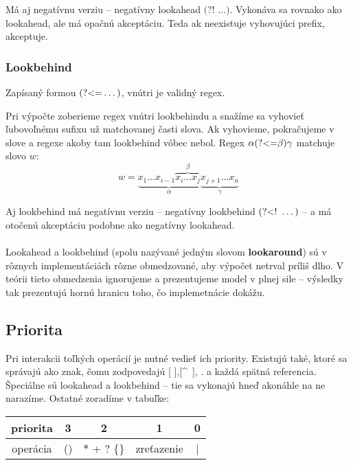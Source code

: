 \documentclass{svk_long_sk}
\def\nlookahead{\text{(?!~}}
\def\lookbehind{\text{(?\textless =}}
\def\nlookbehind{\text{(?\textless !~}}
\begin{document}
Má aj negatívnu verziu -- negatívny lookahead $\nlookahead \dots)$. Vykonáva sa rovnako ako lookahead, ale má opačnú akceptáciu. Teda ak neexistuje vyhovujúci prefix, akceptuje.

\subsubsection*{Lookbehind}
Zapísaný formou $\lookbehind \dots)$, vnútri je validný regex.

Pri výpočte zoberieme regex vnútri lookbehindu a snažíme sa vyhovieť ľubovoľnému sufixu už matchovanej časti slova. Ak vyhovieme, pokračujeme v slove a regexe akoby tam lookbehind vôbec nebol. Regex $\alpha\lookbehind\beta)\gamma$ matchuje slovo $w$:
$$w = \underbrace{x_1\dots x_{i-1} \overbrace{x_i \dots x_j}^\beta}_\alpha \underbrace{x_{j+1} \dots x_n }_\gamma$$

Aj lookbehind má negatívnu verziu -- negatívny lookbehind $\nlookbehind \dots)$ -- a má otočenú akceptáciu podobne ako negatívny lookahead.
\\ \\ Lookahead a lookbehind (spolu nazývané jedným slovom \textbf{lookaround}) sú v rôznych implementáciách rôzne obmedzované, aby výpočet netrval príliš dlho. V teórii tieto obmedzenia ignorujeme a prezentujeme model v plnej sile -- výsledky tak prezentujú hornú hranicu toho, čo implemetnácie dokážu. 

\subsection{Priorita}

Pri interakcii toľkých operácií je nutné vedieť ich priority. Existujú také, ktoré sa správajú ako znak, čomu zodpovedajú [ ],[\textasciicircum ~], . a každá spätná referencia. Špeciálne sú lookahead a lookbehind -- tie sa vykonajú hneď akonáhle na ne narazíme. Ostatné zoradíme v tabuľke: 

\begin{center}
\begin{tabular}{|c||c|c|c|c|}
\hline
priorita &3&2&1& 0  \\
\hline
operácia & () & $*$ + ? $\lbrace \rbrace$ & zreťazenie & | \\ \hline
\end{tabular}
\end{center}
\end{document}
